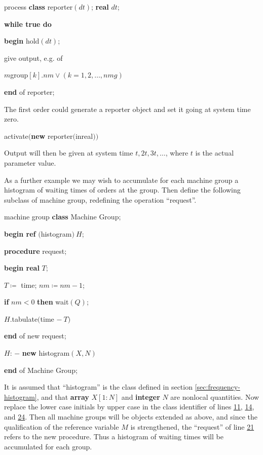 \quad process \textbf{class} reporter$(dt)$; \textbf{real} $dt$;

\quad \textbf{while true do}

\quad \textbf{}\textbf{begin} hold$(dt)$;

\quad \quad give output, e.g. of

\quad \quad $m$group$[k].nm \lor (k = 1, 2, \dots,nmg)$

\quad \textbf{end} of reporter;

The first order could generate a reporter object and set it going at system time zero.

\quad activate$($\textbf{new} reporter$($inreal$))$

\noindent
Output will then be given at system time $t, 2t, 3t, \dots$, where $t$ is the actual parameter value.

As a further example we may wish to accumulate for each machine group a histogram of waiting times of orders at the group. Then define the following subclass of machine group, redefining the operation ``request''.

\quad machine group \textbf{class} Machine Group;

\quad \textbf{begin ref} $($histogram$)\ H$;

\quad \quad \textbf{procedure} request;

\quad \quad \textbf{begin real} $T$;

\quad \quad \quad $T\coloneq$ time; $nm\coloneq nm - 1$;

\quad \quad \quad \textbf{if} $nm < 0$ \textbf{then} wait$(Q)$;

\quad \quad \quad $H$.tabulate$($time $-\ T)$

\quad \quad \textbf{end} of new request;

\quad \quad $H$: $-$ \textbf{new} histogram$(X, N)$

\quad \textbf{end} of Machine Group;

It is assumed that ``histogram'' is the class defined in section \ref{sec:frequency-histogram}, and that \textbf{array} $X[1 : N]$ and \textbf{integer} $N$ are nonlocal quantities. Now replace the lower case initials by upper case in the class identifier of lines \hyperref[pg:program-job-shop-11]{11}, \hyperref[pg:program-job-shop-14]{14}, and \hyperref[pg:program-job-shop-24]{24}. Then all machine groups will be objects extended as above, and since the qualification of the reference variable $M$ is strengthened, the ``request'' of line \hyperref[pg:program-job-shop-21]{21} refers to the new procedure. Thus a histogram of waiting times will be accumulated for each group.

